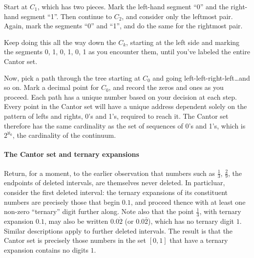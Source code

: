 \documentclass[12pt]{article}
\begin{document}
Start at $C_1$, which has two pieces.  Mark the left-hand segment ``0'' and the right-hand segment ``1''.  Then continue to $C_2$, 
and consider only the leftmost pair.  Again, mark the segments ``0'' and ``1'', and do the same for the rightmost pair.

Keep doing this all the way down the $C_k$, starting at the left side and marking the segments 0, 1, 0, 1, 0, 1 as you encounter them, 
until you've labeled the entire Cantor set.

Now, pick a path through the tree starting at $C_0$ and going left-left-right-left\ldots and so on.  Mark a decimal point for $C_0$, and 
record the zeros and ones as you proceed.  Each path has a unique number based on your decision at each step.
Every point in the Cantor set will have a unique address dependent solely on the pattern of lefts and rights, 0's and 1's, required to 
reach it.
The Cantor set therefore has the same cardinality as the set of sequences of 0's and 1's, which is $2^{\aleph_0}$, the cardinality of the continuum.

\paragraph{The Cantor set and ternary expansions}
Return, for a moment, to the earlier observation that numbers such as $\frac{1}{3}$, $\frac{2}{9}$, the endpoints of deleted intervals, 
are themselves never deleted.  In particluar, consider the first deleted interval:  the ternary expansions of its constituent numbers are 
precisely those that begin $0.1$, and proceed thence with at least one non-zero ``ternary'' digit further along.  Note 
also that the point $\frac{1}{3}$, with ternary expansion $0.1$, may also be written $0.0\dot{2}$ (or $0.0\bar{2}$), which has no ternary digit $1$.
Similar descriptions apply to further deleted intervals.
The result is that the Cantor set is precisely those numbers in the set 
$[0,1]$ that have a ternary expansion contains no digits $1$.
\end{document}
